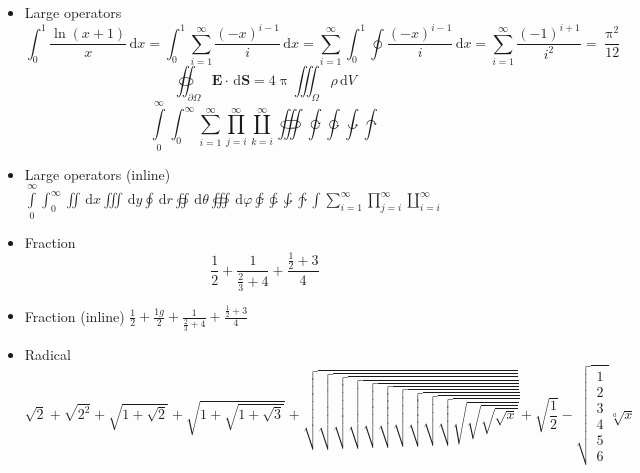 \documentclass[11pt]{article}
\newcommand{\dd}{\,\mathrm{d}}
\begin{document}
\begin{itemize}
  \item Large operators
  \[\int_0^1\frac{\ln (x+1)}{x}\dd{x}=\int_0^1\sum_{i=1}^{\infty}\frac{(-x)^{i-1}}{i}\dd{x}=\sum_{i=1}^{\infty}\int_0^1\oint\frac{(-x)^{i-1}}{i}\dd{x}=\sum_{i=1}^{\infty}\frac{(-1)^{i+1}}{i^2}=\frac{\uppi^2}{12}\]
      \[\oiint_{\partial\Omega}\symbf{E}\cdot\dd{\symbf S}=4\uppi \iiint_{\Omega}\rho\dd{V}\]
        \[
          \int\limits_0^\infty \int_0^\infty
          \sum_{i=1}^\infty \prod_{j=i}^\infty \coprod_{k=i}^\infty
          \oiiint \varointclockwise \ointctrclockwise \awint \intclockwise
        \]

  \item Large operators (inline)
        $ \int\limits_0^\infty \int_0^\infty \iint \dd{x} \iiint \dd{y}
          \oint \dd{r} \oiint \dd{\theta} \oiiint \dd{\varphi}\varointclockwise \ointctrclockwise \awint \intclockwise
          \int\sum_{i=1}^\infty \prod_{j=i}^\infty \coprod_{i=i}^\infty $

  \item Fraction
        \[ \frac{1}{2} + \frac{1}{\frac{2}{3}+4} + \frac{\frac{1}{2}+3}{4} \]

  \item Fraction (inline)
        $ \frac{1}{2} + \frac{1g}{2} + \frac{1}{\frac{2}{3}+4} + \frac{\frac{1}{2}+3}{4} $

  \item Radical
        \[
            \sqrt{2} + \sqrt{2^2} + \sqrt{1+\sqrt{2}} + \sqrt{1+\sqrt{1+\sqrt{3}}}
          + \sqrt{\sqrt{\sqrt{\sqrt{\sqrt{\sqrt{\sqrt{\sqrt{\sqrt{\sqrt{\sqrt{\sqrt{\sqrt{\sqrt{x}}}}}}}}}}}}}} + \sqrt{\frac{1}{2}}-\sqrt{\begin{matrix}
          	1\\2\\3\\4\\5\\6
            \end{matrix}}
            \sqrt[a]{x}
        \]


\end{itemize}
\end{document}
